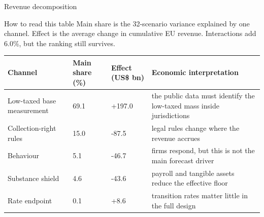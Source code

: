 \documentclass[aspectratio=169, 11pt]{beamer}
\begin{document}
\begin{frame}{Revenue decomposition}
\footnotesize
\begin{block}{How to read this table}
  Main share is the 32-scenario variance explained by one channel. Effect is the average change in cumulative EU revenue. Interactions add 6.0\%, but the ranking still survives.
\end{block}

\vspace{0.1em}
\begin{center}
\scriptsize
\begin{tabular}{@{}L{2.55cm}C{1.85cm}C{2.05cm}L{4.55cm}@{}}
  \toprule
  Channel & Main share (\%) & Effect (US\$ bn) & Economic interpretation \\
  \midrule
  Low-taxed base measurement & 69.1 & +197.0 & the public data must identify the low-taxed mass inside jurisdictions \\
  Collection-right rules & 15.0 & -87.5 & legal rules change where the revenue accrues \\
  Behaviour & 5.1 & -46.7 & firms respond, but this is not the main forecast driver \\
  Substance shield & 4.6 & -43.6 & payroll and tangible assets reduce the effective floor \\
  Rate endpoint & 0.1 & +8.6 & transition rates matter little in the full design \\
  \bottomrule
\end{tabular}
\end{center}

\end{frame}
\end{document}
